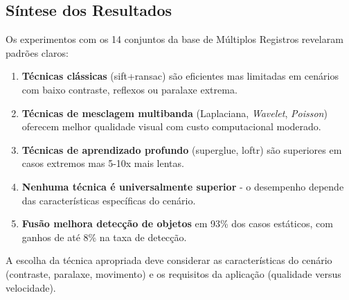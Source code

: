 \subsection{Síntese dos Resultados}

Os experimentos com os 14 conjuntos da base de Múltiplos Registros revelaram padrões claros:

\begin{enumerate}
\item \textbf{Técnicas clássicas} (\gls{sift}+\gls{ransac}) são eficientes mas limitadas em cenários com baixo contraste, reflexos ou paralaxe extrema.
\item \textbf{Técnicas de mesclagem multibanda} (Laplaciana, \textit{Wavelet}, \textit{Poisson}) oferecem melhor qualidade visual com custo computacional moderado.
\item \textbf{Técnicas de aprendizado profundo} (\gls{superglue}, \gls{loftr}) são superiores em casos extremos mas 5-10x mais lentas.
\item \textbf{Nenhuma técnica é universalmente superior} - o desempenho depende das características específicas do cenário.
\item \textbf{Fusão melhora detecção de objetos} em 93\% dos casos estáticos, com ganhos de até 8\% na taxa de detecção.
\end{enumerate}

A escolha da técnica apropriada deve considerar as características do cenário (contraste, paralaxe, movimento) e os requisitos da aplicação (qualidade versus velocidade).

